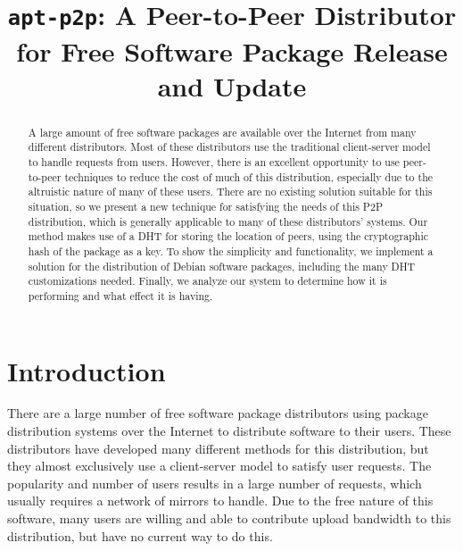 \documentclass[conference]{IEEEtran}
\begin{document}
\title{\texttt{apt-p2p}: A Peer-to-Peer Distributor for Free Software Package Release and Update}
\author{
\and
{}
}

\maketitle

\begin{abstract}
A large amount of free software packages are available over the
Internet from many different distributors. Most of these
distributors use the traditional client-server model to handle
requests from users. However, there is an excellent opportunity to
use peer-to-peer techniques to reduce the cost of much of this
distribution, especially due to the altruistic nature of many of
these users. There are no existing solution suitable for this
situation, so we present a new technique for satisfying the needs of
this P2P distribution, which is generally applicable to many of
these distributors' systems. Our method makes use of a DHT for
storing the location of peers, using the cryptographic hash of the
package as a key. To show the simplicity and functionality, we
implement a solution for the distribution of Debian software
packages, including the many DHT customizations needed. Finally, we
analyze our system to determine how it is performing and what effect
it is having.
\end{abstract}


\section{Introduction}
\label{intro}

There are a large number of free software package distributors using
package distribution systems over the Internet to distribute
software to their users. These distributors have developed many
different methods for this distribution, but they almost exclusively
use a client-server model to satisfy user requests. The popularity
and number of users results in a large number of requests, which
usually requires a network of mirrors to handle. Due to the free
nature of this software, many users are willing and able to
contribute upload bandwidth to this distribution, but have no
current way to do this.
\end{document}
